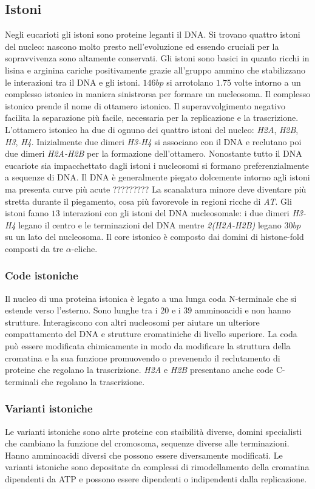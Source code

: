 \subsection{Istoni}
Negli eucarioti gli istoni sono proteine leganti il DNA. Si trovano quattro istoni del nucleo: nascono molto presto nell'evoluzione ed essendo cruciali per la sopravvivenza sono 
altamente conservati. Gli istoni sono basici in quanto ricchi in lisina e arginina cariche positivamente grazie all'gruppo ammino  che stabilizzano le interazioni tra il DNA
e gli istoni. $146bp$ si arrotolano $1.75$ volte intorno a un complesso istonico in maniera sinistrorsa per formare un nucleosoma. Il complesso istonico prende il nome di ottamero 
istonico. Il superavvolgimento negativo facilita la separazione pi\`u facile, necessaria per la replicazione e la trascrizione. L'ottamero istonico ha due di ognuno dei quattro 
istoni del nucleo: \emph{H2A}, \emph{H2B}, \emph{H3}, \emph{H4}. Inizialmente due dimeri \emph{H3-H4} si associano con il DNA e reclutano poi due dimeri \emph{H2A-H2B} per la formazione
dell'ottamero. Nonostante tutto il DNA eucariote sia impacchettato dagli istoni i nucleosomi si formano preferenzialmente a sequenze di DNA. Il DNA \`e generalmente piegato dolcemente
intorno agli istoni ma presenta curve pi\`u acute ????????? La scanalatura minore deve diventare pi\`u stretta durante il piegamento, cosa pi\`u favorevole in regioni ricche di 
\emph{AT}. Gli istoni fanno $13$ interazioni con gli istoni del DNA nucleosomale: i due dimeri \emph{H3-H4} legano il centro e le terminazioni del DNA mentre \emph{2(H2A-H2B)} legano
$30bp$ su un lato del nucleosoma. Il core istonico \`e composto dai domini di histone-fold composti da tre $\alpha$-eliche. 
\subsubsection{Code istoniche}
Il nucleo di una proteina istonica \`e legato a una lunga coda N-terminale che si estende verso l'esterno. Sono lunghe tra i $20$ e i $39$ amminoacidi e non hanno strutture. 
Interagiscono con altri nucleosomi per aiutare un ulteriore compattamento del DNA e strutture cromatiniche di livello superiore. La coda pu\`o essere modificata chimicamente in modo
da modificare la struttura della cromatina e la sua funzione promuovendo o prevenendo il reclutamento di proteine che regolano la trascrizione. \emph{H2A} e \emph{H2B} presentano
anche code C-terminali che regolano la trascrizione.
\subsubsection{Varianti istoniche}
Le varianti istoniche sono alrte proteine con staibilit\`a diverse, domini specialisti che cambiano la funzione del cromosoma, sequenze diverse alle terminazioni. Hanno amminoacidi
diversi che possono essere diversamente modificati. Le varianti istoniche sono depositate da complessi di rimodellamento della cromatina dipendenti da ATP e possono essere 
dipendenti o indipendenti dalla replicazione. 
